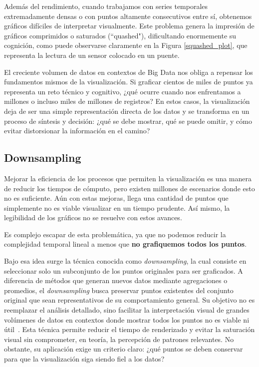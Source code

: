 Además del rendimiento, cuando trabajamos con series temporales extremadamente densas o con puntos altamente consecutivos entre sí, obtenemos gráficos difíciles de interpretar visualmente. Este problema genera la impresión de gráficos comprimidos o saturados (``quashed"), dificultando enormemente su cognición, como puede observarse claramente en la Figura \ref{squashed_plot}, que representa la lectura de un sensor colocado en un puente.

El creciente volumen de datos en contextos de Big Data nos obliga a repensar los fundamentos mismos de la visualización. Si graficar cientos de miles de puntos ya representa un reto técnico y cognitivo, ¿qué ocurre cuando nos enfrentamos a millones o incluso miles de millones de registros? En estos casos, la visualización deja de ser una simple representación directa de los datos y se transforma en un proceso de síntesis y decisión: ¿qué se debe mostrar, qué se puede omitir, y cómo evitar distorsionar la información en el camino?


\subsection{Downsampling}

Mejorar la eficiencia de los procesos que permiten la visualización es una manera de reducir los tiempos de cómputo, pero existen millones de escenarios donde esto no es suficiente. Aún con estas mejoras, llega una cantidad de puntos que simplemente no es viable visualizar en un tiempo prudente. Así mismo, la legibilidad de los gráficos no se resuelve con estos avances.

Es complejo escapar de esta problemática, ya que no podemos reducir la complejidad temporal lineal a menos que \textbf{no grafiquemos todos los puntos}.

Bajo esa idea surge la técnica conocida como \textit{downsampling}, la cual consiste en seleccionar solo un subconjunto de los puntos originales para ser graficados. A diferencia de métodos que generan nuevos datos mediante agregaciones o promedios, el \textit{downsampling} busca preservar puntos existentes del conjunto original que sean representativos de su comportamiento general. Su objetivo no es reemplazar el análisis detallado, sino facilitar la interpretación visual de grandes volúmenes de datos en contextos donde mostrar todos los puntos no es viable ni útil~\cite{steinarsson2013downsampling}. Esta técnica permite reducir el tiempo de renderizado y evitar la saturación visual sin comprometer, en teoría, la percepción de patrones relevantes. No obstante, su aplicación exige un criterio claro: ¿qué puntos se deben conservar para que la visualización siga siendo fiel a los datos?

